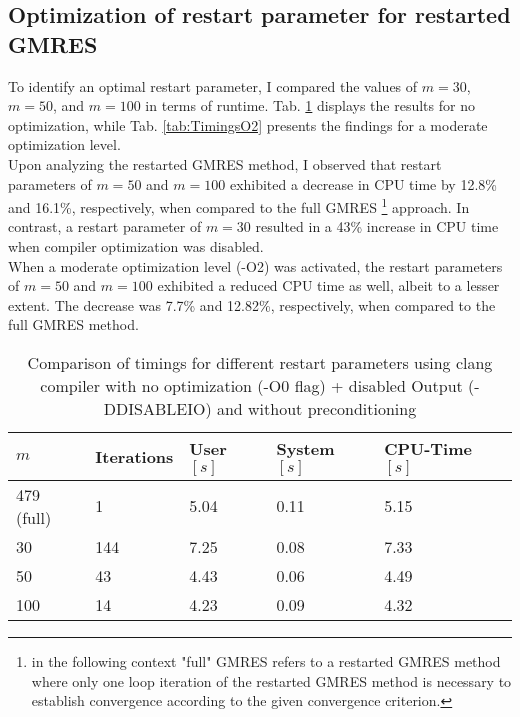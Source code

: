 \documentclass[11pt,a4paper]{article}
\newcommand{\refTab}[1]{Tab. \ref{#1}}
\begin{document}
\subsection{Optimization of restart parameter for restarted GMRES}
To identify an optimal restart parameter, I compared the values of $m=30$, $m=50$, and $m=100$ in terms of runtime. \refTab{tab:TimingsO0} displays the results for no optimization, while \refTab{tab:TimingsO2} presents the findings for a moderate optimization level.\\
%
Upon analyzing the restarted GMRES method, I observed that restart parameters of $m=50$ and $m=100$ exhibited a decrease in CPU time by 12.8\% and 16.1\%, respectively, when compared to the full GMRES \footnote{in the following context "full" GMRES refers to a restarted GMRES method where only one loop iteration of the restarted GMRES method is necessary to establish convergence according to the given convergence criterion.} approach. In contrast, a restart parameter of $m=30$ resulted in a 43\% increase in CPU time when compiler optimization was disabled.\\
%
When a moderate optimization level (-O2) was activated, the restart parameters of $m=50$ and $m=100$ exhibited a reduced CPU time as well, albeit to a lesser extent. The decrease was 7.7\% and 12.82\%, respectively, when compared to the full GMRES method.\\
% 
\renewcommand{\arraystretch}{2}
\begin{table}[h!]
	\begin{center}
		\begin{tabular}{ p{2cm} p{2cm} p{1.5cm} p{1.8cm} p{2.5cm}}
			\hline
			\hline
			$m$ & Iterations & User $[s]$ & System $[s]$ & CPU-Time $[s]$ \\
			\hline
			\hline
			479 (full) & 1 & 5.04 & 0.11 & 5.15\\
			\hline
			\hline
			30 & 144 & 7.25 & 0.08 & 7.33\\
			\hline
			50 & 43 & 4.43 & 0.06 & 4.49\\
			\hline
			100 & 14 & 4.23 & 0.09 & 4.32\\
			\hline
			\hline
		\end{tabular}
		\caption{\label{tab:TimingsO0}  Comparison of timings for different restart parameters using clang compiler with no optimization (-O0 flag) + disabled Output (-DDISABLEIO) and without preconditioning}
	\end{center}
\end{table}
\renewcommand{\arraystretch}{1}
\end{document}
